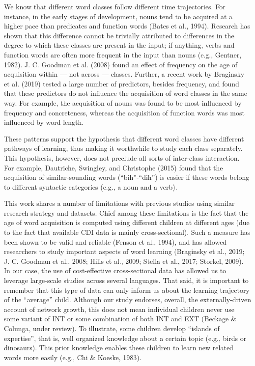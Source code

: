 \documentclass[english,floatsintext,man]{apa6}
\theoremstyle{definition}
\theoremstyle{definition}
\theoremstyle{definition}
\theoremstyle{remark}
\begin{document}
We know that different word classes follow different time trajectories.
For instance, in the early stages of development, nouns tend to be
acquired at a higher pace than predicates and function words (Bates et
al., 1994). Research has shown that this difference cannot be trivially
attributed to differences in the degree to which these classes are
present in the input; if anything, verbs and function words are often
more frequent in the input than nouns (e.g., Gentner, 1982). J. C.
Goodman et al. (2008) found an effect of frequency on the age of
acquisition within --- not across --- classes. Further, a recent work by
Braginsky et al. (2019) tested a large number of predictors, besides
frequency, and found that these predictors do not influence the
acquisition of word classes in the same way. For example, the
acquisition of nouns was found to be most influenced by frequency and
concreteness, whereas the acquisition of function words was most
influenced by word length.

These patterns support the hypothesis that different word classes have
different pathways of learning, thus making it worthwhile to study each
class separately. This hypothesis, however, does not preclude all sorts
of inter-class interaction. For example, Dautriche, Swingley, and
Christophe (2015) found that the acquisition of similar-sounding words
(\enquote{bih}-\enquote{dih}) is easier if these words belong to
different syntactic categories (e.g., a noun and a verb).

This work shares a number of limitations with previous studies using
similar research strategy and datasets. Chief among these limitations is
the fact that the age of word acquisition is computed using different
children at different ages (due to the fact that available CDI data is
mainly cross-sectional). Such a measure has been shown to be valid and
reliable (Fenson et al., 1994), and has allowed researchers to study
important aspects of word learning (Braginsky et al., 2019; J. C.
Goodman et al., 2008; Hills et al., 2009; Stella et al., 2017; Storkel,
2009). In our case, the use of cost-effective cross-sectional data has
allowed us to leverage large-scale studies across several languages.
That said, it is important to remember that this type of data can only
inform us about the learning trajectory of the \enquote{average} child.
Although our study endorses, overall, the externally-driven account of
network growth, this does not mean individual children never use some
variant of INT or some combination of both INT and EXT (Beckage \&
Colunga, under review). To illustrate, some children develop
\enquote{islands of expertise}, that is, well organized knowledge about
a certain topic (e.g., birds or dinosaurs). This prior knowledge enables
these children to learn new related words more easily (e.g., Chi \&
Koeske, 1983).
\end{document}
